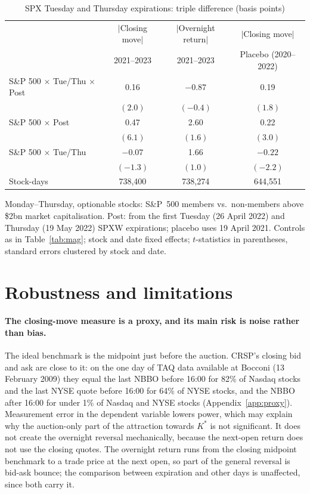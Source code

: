 \documentclass[11pt,a4paper]{article}
\newcommand{\Kstar}{K^{*}}
\begin{document}
\begin{table}[ht]
\centering
\begin{threeparttable}
\caption{SPX Tuesday and Thursday expirations: triple difference (basis points)}
\label{tab:spx}
\small
\begin{tabular}{lccc}
\toprule
 & $|$Closing move$|$ & $|$Overnight return$|$ & $|$Closing move$|$ \\
 & 2021--2023 & 2021--2023 & Placebo (2020--2022) \\
\midrule
S\&P 500 $\times$ Tue/Thu $\times$ Post & 0.16 & $-0.87$ & 0.19 \\
 & $(2.0)$ & $(-0.4)$ & $(1.8)$ \\
S\&P 500 $\times$ Post & 0.47 & 2.60 & 0.22 \\
 & $(6.1)$ & $(1.6)$ & $(3.0)$ \\
S\&P 500 $\times$ Tue/Thu & $-0.07$ & 1.66 & $-0.22$ \\
 & $(-1.3)$ & $(1.0)$ & $(-2.2)$ \\
\midrule
Stock-days & 738,400 & 738,274 & 644,551 \\
\bottomrule
\end{tabular}
\begin{tablenotes}\footnotesize
\item Monday--Thursday, optionable stocks: S\&P~500 members vs.\ non-members above \$2bn market capitalisation. Post: from the first Tuesday (26 April 2022) and Thursday (19 May 2022) SPXW expirations; placebo uses 19 April 2021. Controls as in Table~\ref{tab:mag}; stock and date fixed effects; $t$-statistics in parentheses, standard errors clustered by stock and date.
\end{tablenotes}
\end{threeparttable}
\end{table}

\section{Robustness and limitations}
\label{sec:limits}

\paragraph{The closing-move measure is a proxy, and its main risk is noise rather than bias.} The ideal benchmark is the midpoint just before the auction. CRSP's closing bid and ask are close to it: on the one day of TAQ data available at Bocconi (13 February 2009) they equal the last NBBO before 16:00 for 82\% of Nasdaq stocks and the last NYSE quote before 16:00 for 64\% of NYSE stocks, and the NBBO after 16:00 for under 1\% of Nasdaq and NYSE stocks (Appendix~\ref{app:proxy}). Measurement error in the dependent variable lowers power, which may explain why the auction-only part of the attraction towards $\Kstar$ is not significant. It does not create the overnight reversal mechanically, because the next-open return does not use the closing quotes. The overnight return runs from the closing midpoint benchmark to a trade price at the next open, so part of the general reversal is bid-ask bounce; the comparison between expiration and other days is unaffected, since both carry it.
\end{document}
